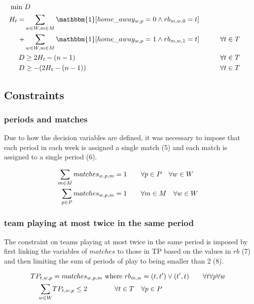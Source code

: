\begin{align}
    \min \ &D \\
    H_t =& \sum_{w \in W, m \in M} \mathbbm{1}[home\_away_{w,p} = 0 \land rb_{m,w,0} = t] \notag \\
    +& \sum_{w \in W, m \in M} \mathbbm{1}[home\_away_{w,p} = 1 \land rb_{m, w,1} = t] \hspace{20px}  && \forall t \in T\\
    D &\geq 2H_t - (n-1) && \forall t \in T\\
    D & \geq -(2 H_t - (n-1)) && \forall t \in T
\end{align}

\subsection{Constraints}
\subsubsection{periods and matches}
Due to how the decision variables are defined, it was necessary to impose that each period in each week is assigned a single match (5) and each match is assigned to a single period (6).

\begin{align}
    \sum_{m \in M} matches_{w,p,m} &= 1 \hspace{20px} \forall p \in P \hspace{10px} \forall w \in W\\
    \sum_{p \in P} matches_{w,p,m} &= 1 \hspace{20px} \forall m \in M \hspace{10px}\forall w \in W
\end{align}

\subsubsection{team playing at most twice in the same period}
The constraint on teams playing at most twice in the same period is imposed by first linking the variables of $matches$ to those in TP based on the values in $rb$ (7) and then limiting the sum of periods of play to being smaller than 2 (8). 

\begin{align}
    TP_{t,w,p} &= matches_{w,p,m} \ \text{where} \ rb_{m, w} =(t, t') \lor (t', t) \hspace{20px} \forall t \forall p  \forall w\\
    \sum_{w \in W} &TP_{t,w,p} \leq 2 \hspace{40px} \forall t \in T \hspace{10px} \forall p \in P
\end{align}

